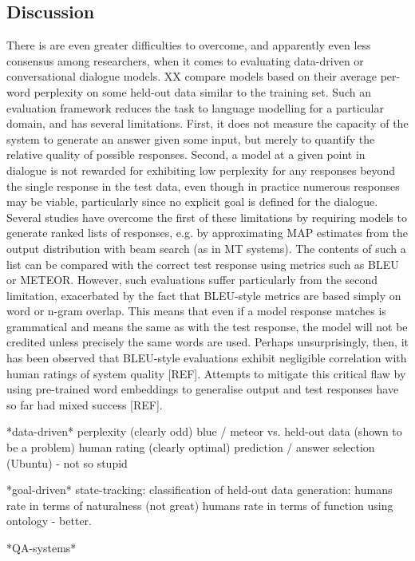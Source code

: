 \documentclass[11pt,letterpaper]{article}
\begin{document}
\subsection{Discussion}

There is are even greater difficulties to overcome, and apparently even less consensus among researchers, when it comes to evaluating data-driven or conversational dialogue models. XX compare models based on their average per-word perplexity on some held-out data similar to the training set. Such an evaluation framework reduces the task to language modelling for a particular domain, and has several limitations. First, it does not measure the capacity of the system to generate an answer given some input, but merely to quantify the relative quality of possible responses. Second, a model at a given point in dialogue is not rewarded for exhibiting low perplexity for any responses beyond the single response in the test data, even though in practice numerous responses may be viable, particularly since no explicit goal is defined for the dialogue. Several studies have overcome the first of these limitations by requiring models to generate ranked lists of responses, e.g. by approximating MAP estimates from the output distribution with beam search (as in MT systems). The contents of such a list can be compared with the correct test response using metrics such as BLEU or METEOR. However, such evaluations suffer particularly from the second limitation, exacerbated by the fact that BLEU-style metrics are based simply on word or n-gram overlap. This means that even if a model response matches is grammatical and means the same as with the test response, the model will not be credited unless precisely the same words are used. Perhaps unsurprisingly, then, it has been observed that BLEU-style evaluations exhibit negligible correlation with human ratings of system quality [REF]. Attempts to mitigate this critical flaw by using pre-trained word embeddings to generalise output and test responses have so far had mixed success [REF].   

*data-driven*
perplexity (clearly odd)
blue / meteor vs. held-out data (shown to be a problem)
human rating (clearly optimal)
prediction / answer selection (Ubuntu) - not so stupid

*goal-driven*
state-tracking: classification of held-out data 
generation: humans rate in terms of naturalness (not great)
humans rate in terms of function using ontology - better.

*QA-systems*
\end{document}
